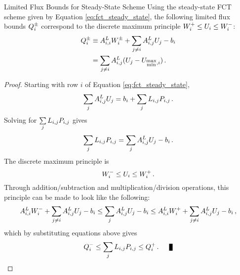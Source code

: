\begin{theorem}{Limited Flux Bounds for Steady-State Scheme}
   Using the steady-state FCT scheme given by Equation
   \eqref{eq:fct_steady_state},
   the following limited flux bounds $Q_i^\pm$ correspond to the
   discrete maximum principle
   $W_i^+\le U_i\le W_i^-$:
   \begin{equation}
   \begin{split}
     Q_i^\pm & \equiv A_{i,i}^L W_i^\pm
       + \sum\limits_{j\ne i}A_{i,j}^LU_j - b_i\\
     & = \sum\limits_{j\ne i}A_{i,j}^L(U_j
       - U_{\substack{\max\\\min},i}) \,.
   \end{split}
   \end{equation}
\end{theorem}

\begin{proof}
   Starting with row $i$ of Equation \eqref{eq:fct_steady_state},
   \[
      \sumj \ssmatrixletter\ij^L \solutionletter_j
      = \ssrhsletter_i + \limitedfluxsumi \eqp
   \]
   Solving for $\limitedfluxsumi$ gives
   \[
      \limitedfluxsumi = \sumj\ssmatrixletter\ij^L\solutionletter_j
      - \ssrhsletter_i \eqp
   \]
   The discrete maximum principle is
   \[
      W_i^-\le U_i\le W_i^+ \,.
   \]
   Through addition/subtraction and multiplication/division operations, this
   principle can be made to look like the following:
   \[
   A_{i,i}^L W_i^-
     + \sum\limits_{j\ne i}A_{i,j}^LU_j - b_i
   \le \sum\limits_j A_{i,j}^L U_j - b_i
   \le A_{i,i}^L W_i^+
     + \sum\limits_{j\ne i}A_{i,j}^L U_j - b_i \,,
   \]
   which by substituting equations above gives
   \[
      \limitedfluxbound_i^-\le\limitedfluxsumi\le \limitedfluxbound_i^+ \eqp\qed
   \]
\end{proof}
